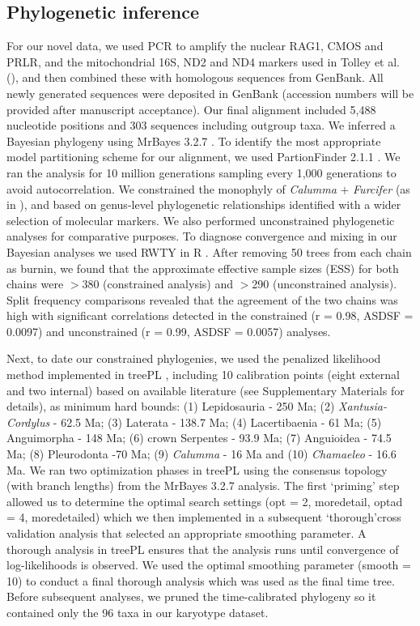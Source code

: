 \documentclass[a4paper, 12pt]{article}
\begin{document}
\subsection{Phylogenetic inference}
For our novel data, we used PCR to amplify the nuclear RAG1, CMOS and PRLR, and the mitochondrial 16S, ND2 and ND4 markers used in Tolley et al. (\citeyear{tolley2013large}), and then combined these with homologous sequences from GenBank. 
All newly generated sequences were deposited in GenBank (accession numbers will be provided after manuscript acceptance). 
Our final alignment included 5,488 nucleotide positions and 303 sequences including outgroup taxa. 
We inferred a Bayesian phylogeny using MrBayes 3.2.7 \citep{ronquist2012mrbayes}.
To identify the most appropriate model partitioning scheme for our alignment, we used PartionFinder 2.1.1 \citep{lanfear2017partitionfinder}. 
We ran the analysis for 10 million generations sampling every 1,000 generations to avoid autocorrelation. 
We constrained the monophyly of \textit{Calumma} $+$ \textit{Furcifer} (as in \citealt{tolley2013large}), and based on genus-level phylogenetic relationships identified with a wider selection of molecular markers. 
We also performed unconstrained phylogenetic analyses for comparative purposes.
To diagnose convergence and mixing in our Bayesian analyses we used RWTY \citep{warren2017rwty} in R \citep{R}. 
After removing 50 trees from each chain as burnin, we found that the approximate effective sample sizes (ESS) for both chains were $>$380 (constrained analysis) and $>$290 (unconstrained analysis). 
Split frequency comparisons revealed that the agreement of the two chains was high with significant correlations detected in the constrained (r = 0.98, ASDSF = 0.0097) and unconstrained (r = 0.99, ASDSF = 0.0057) analyses. 
 
Next, to date our constrained phylogenies, we used the penalized likelihood method implemented in treePL \citep{smith2012treepl}, including 10 calibration points (eight external and two internal) based on available literature (see Supplementary Materials for details), as minimum hard bounds: (1) Lepidosauria - 250 Ma; (2) \textit{Xantusia-Cordylus} - 62.5 Ma; (3) Laterata - 138.7 Ma; (4) Lacertibaenia - 61 Ma; (5) Anguimorpha - 148 Ma; (6) crown Serpentes - 93.9 Ma; (7) Anguioidea - 74.5 Ma; (8) Pleurodonta -70 Ma; (9) \textit{Calumma} - 16 Ma and (10) \textit{Chamaeleo} - 16.6 Ma. 
We ran two optimization phases in treePL \citep{smith2012treepl} using the consensus topology (with branch lengths) from the MrBayes 3.2.7 analysis. 
The first `priming' step allowed us to determine the optimal search settings (opt = 2, moredetail, optad = 4, moredetailed) which we then implemented in a subsequent `thorough'cross validation analysis that selected an appropriate smoothing parameter. 
A thorough analysis in treePL ensures that the analysis runs until convergence of log-likelihoods is observed. 
We used the optimal smoothing parameter (smooth = 10) to conduct a final thorough analysis which was used as the final time tree.
Before subsequent analyses, we pruned the time-calibrated phylogeny so it contained only the 96 taxa in our karyotype dataset.
\end{document}
